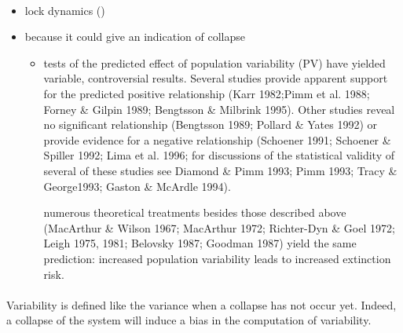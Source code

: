 \documentclass{article}
\begin{document}
\paragraph{} %
\begin{itemize}
    \item lock dynamics ()
    \item because it could give an indication of collapse 
    \begin{itemize}
        \item tests of the predicted effect of population variability (PV) have yielded variable, controversial results. Several studies provide apparent support for the predicted positive relationship (Karr 1982;Pimm et al. 1988; Forney \& Gilpin 1989; Bengtsson \& Milbrink 1995). Other studies reveal no significant relationship (Bengtsson 1989; Pollard \& Yates 1992) or provide evidence for a negative relationship (Schoener 1991; Schoener \& Spiller 1992; Lima et al. 1996; for discussions of the statistical validity of several of these studies see Diamond \& Pimm 1993; Pimm 1993; Tracy \& George1993; Gaston \& McArdle 1994).
        
        numerous theoretical treatments besides those described above (MacArthur \& Wilson 1967; MacArthur 1972; Richter-Dyn \& Goel 1972; Leigh 1975, 1981; Belovsky 1987; Goodman 1987) yield the same prediction: increased population variability leads to increased extinction risk.
        
    \end{itemize}
\end{itemize}


\paragraph{}
Variability is defined like the variance when a collapse has not occur yet. Indeed, a collapse of the system will induce a bias in the computation of variability.
\end{document}

